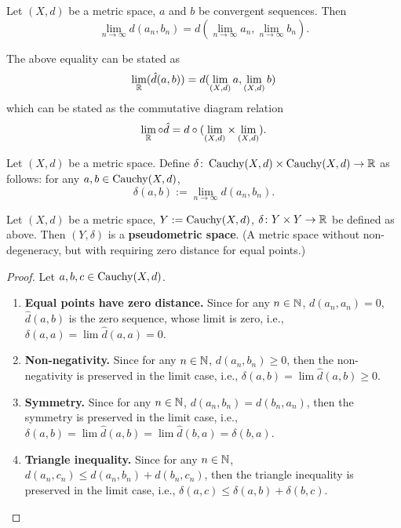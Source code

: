 \begin{corollary}
  Let $(X, d)$ be a metric space, $a$ and $b$ be convergent sequences.
  Then
  \begin{equation}
    \lim_{n \to \infty} d(a_n, b_n)
    = d\left(\lim_{n \to \infty} a_n, \lim_{n \to \infty} b_n\right).
  \end{equation}
\end{corollary}
\begin{remark}
  The above equality can be stated as
  \begin{equation}
    \lim_{\mathbb{R}}(\hat{d}(a, b)) = d(\lim_{(X, d)} a, \lim_{(X, d)} b)
  \end{equation}
  which can be stated as the commutative diagram relation
  \begin{equation}
    \lim_{\mathbb{R}} \circ \hat{d} = d \circ (\lim_{(X, d)} \times \lim_{(X, d)}).
  \end{equation}
\end{remark}
\begin{definition}
  Let $(X, d)$ be a metric space.
  Define $\delta \colon \mathop{\rm Cauchy}\nolimits(X, d) \times \mathop{\rm Cauchy}\nolimits(X, d) \to \mathbb{R}$ as follows:
  for any $a, b \in \mathop{\rm Cauchy}\nolimits(X, d)$,
  \begin{equation}
    \delta(a, b) := \lim_{n \to \infty} d(a_n, b_n).
  \end{equation}
\end{definition}
\begin{proposition}
  Let
    $(X, d)$ be a metric space,
    $Y := \mathop{\rm Cauchy}\nolimits(X, d)$,
    $\delta \colon Y \times Y \to \mathbb{R}$ be defined as above.
  Then $(Y, \delta)$ is a \textbf{pseudometric space}.
  (A metric space without non-degeneracy, but with requiring zero distance for
  equal points.)
\end{proposition}
\begin{proof}
  Let $a, b, c \in \mathop{\rm Cauchy}\nolimits(X, d)$.
  \begin{enumerate}
    \item
      \textbf{Equal points have zero distance.}
      Since for any $n \in \mathbb{N}$, $d(a_n, a_n) = 0$, $\hat{d}(a, b)$ is the zero
      sequence, whose limit is zero, i.e.,
      $\delta(a, a) = \lim \hat{d}(a, a) = 0$.
    \item
      \textbf{Non-negativity.}
      Since for any $n \in \mathbb{N}$, $d(a_n, b_n) \geq 0$,
      then the non-negativity is preserved in the limit case, i.e.,
      $\delta(a, b) = \lim \hat{d}(a, b) \geq 0$.
    \item
      \textbf{Symmetry.}
      Since for any $n \in \mathbb{N}$, $d(a_n, b_n) = d(b_n, a_n)$,
      then the symmetry is preserved in the limit case, i.e.,
      $\delta(a, b) = \lim \hat{d}(a, b) = \lim \hat{d}(b, a) = \delta(b, a)$.
    \item
      \textbf{Triangle inequality.}
      Since for any $n \in \mathbb{N}$, $d(a_n, c_n) \leq d(a_n, b_n) + d(b_n, c_n)$,
      then the triangle inequality is preserved in the limit case, i.e.,
      $\delta(a, c) \leq \delta(a, b) + \delta(b, c)$.
  \end{enumerate}
\end{proof}
